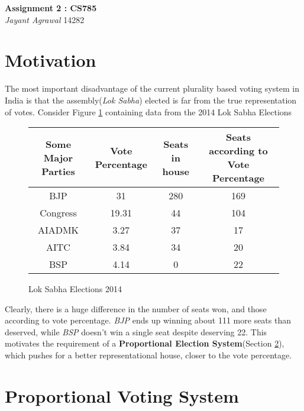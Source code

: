 \documentclass{article}
\begin{document}

\begin{center}
\textbf{\Large Assignment 2 : CS785} \\
\textit{\large Jayant Agrawal}         14282
\end{center}

\section{Motivation}
The most important disadvantage of the current plurality based voting system in India is that the assembly(\emph{Lok Sabha}) elected is far from the true representation of votes. Consider Figure \ref{tab} containing data from the 2014 Lok Sabha Elections

\begin{figure}[h!]
\begin{center}
\begin{tabular}{|c|c|c|c|}
\hline
\textbf{Some Major Parties} & \textbf{Vote Percentage} & \textbf{Seats in house} & \textbf{Seats according to Vote Percentage} \\
\hline
BJP & 31 & 280 & 169 \\
Congress & 19.31 & 44 & 104 \\
AIADMK & 3.27 & 37 & 17 \\
AITC & 3.84 & 34 & 20 \\
BSP & 4.14 & 0 & 22 \\
\hline
\end{tabular}
\label{tab}
\caption{Lok Sabha Elections 2014}
\end{center}
\end{figure}

Clearly, there is a huge difference in the number of seats won, and those according to vote percentage. \emph{BJP} ends up winning about 111 more seats than deserved, while \emph{BSP} doesn't win a single seat despite deserving 22. This motivates the requirement of a \textbf{Proportional Election System}(Section \ref{prop}), which pushes for a better representational house, closer to the vote percentage.

\section{Proportional Voting System}
\label{prop}
\end{document}
